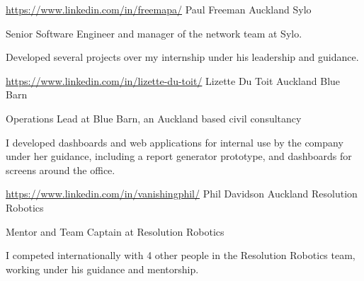 
\begin{cventries}
  \cventry
    {\href{https://www.linkedin.com/in/freemapa/}{\faLink \space https://www.linkedin.com/in/freemapa/}} %
    {Paul Freeman} %
    {Auckland} %
    {Sylo} %
    {
      \begin{cvitems} %
        \item {Senior Software Engineer and manager of the network team at Sylo.}
        \item {Developed several projects over my internship under his leadership and guidance.}
      \end{cvitems}
    }

  \cventry
    {\href{https://www.linkedin.com/in/lizette-du-toit/}{\faLink \space https://www.linkedin.com/in/lizette-du-toit/}} %
    {Lizette Du Toit} %
    {Auckland} %
    {Blue Barn} %
    {
      \begin{cvitems} %
        \item {Operations Lead at Blue Barn, an Auckland based civil consultancy}
        \item {I developed dashboards and web applications for internal use by the company under her guidance, including a report generator prototype, and dashboards for screens around the office.}
      \end{cvitems}
    }

  \cventry
    {\href{https://www.linkedin.com/in/vanishingphil/}{\faLink \space https://www.linkedin.com/in/vanishingphil/}} %
    {Phil Davidson} %
    {Auckland} %
    {Resolution Robotics} %
    {
      \begin{cvitems} %
        \item {Mentor and Team Captain at Resolution Robotics}
        \item {I competed internationally with 4 other people in the Resolution Robotics team, working under his guidance and mentorship.}
      \end{cvitems}
    }

\end{cventries}

